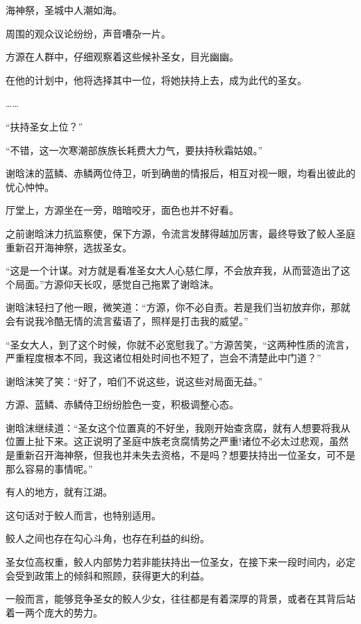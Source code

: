 
\begin{this_body}



海神祭，圣城中人潮如海。

周围的观众议论纷纷，声音嘈杂一片。

方源在人群中，仔细观察着这些候补圣女，目光幽幽。

在他的计划中，他将选择其中一位，将她扶持上去，成为此代的圣女。

……

“扶持圣女上位？”

“不错，这一次寒潮部族族长耗费大力气，要扶持秋霜姑娘。”

谢晗沫的蓝鳞、赤鳞两位侍卫，听到确凿的情报后，相互对视一眼，均看出彼此的忧心忡忡。

厅堂上，方源坐在一旁，暗暗咬牙，面色也并不好看。

之前谢晗沫力抗监察使，保下方源，令流言发酵得越加厉害，最终导致了鲛人圣庭重新召开海神祭，选拔圣女。

“这是一个计谋。对方就是看准圣女大人心慈仁厚，不会放弃我，从而营造出了这个局面。”方源仰天长叹，感觉自己拖累了谢晗沫。

谢晗沫轻扫了他一眼，微笑道：“方源，你不必自责。若是我们当初放弃你，那就会有说我冷酷无情的流言蜚语了，照样是打击我的威望。”

“圣女大人，到了这个时候，你就不必宽慰我了。”方源苦笑，“这两种性质的流言，严重程度根本不同，我这诸位相处时间也不短了，岂会不清楚此中门道？”

谢晗沫笑了笑：“好了，咱们不说这些，说这些对局面无益。”

方源、蓝鳞、赤鳞侍卫纷纷脸色一变，积极调整心态。

谢晗沫继续道：“圣女这个位置真的不好坐，我刚开始查贪腐，就有人想要将我从位置上扯下来。这正说明了圣庭中族老贪腐情势之严重!诸位不必太过悲观，虽然是重新召开海神祭，但我也并未失去资格，不是吗？想要扶持出一位圣女，可不是那么容易的事情呢。”

有人的地方，就有江湖。

这句话对于鲛人而言，也特别适用。

鲛人之间也存在勾心斗角，也存在利益的纠纷。

圣女位高权重，鲛人内部势力若非能扶持出一位圣女，在接下来一段时间内，必定会受到政策上的倾斜和照顾，获得更大的利益。

一般而言，能够竞争圣女的鲛人少女，往往都是有着深厚的背景，或者在其背后站着一两个庞大的势力。


\end{this_body}
